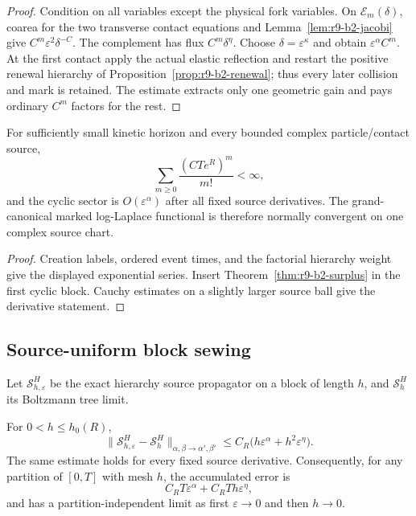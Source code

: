 \begin{proof}
Condition on all variables except the physical fork variables.  On
$\mathcal E_m(\delta)$, coarea for the two transverse contact equations and
Lemma~\ref{lem:r9-b2-jacobi} give
$C^m\varepsilon^2\delta^{-C}$.  The complement has flux
$C^m\delta^\eta$.  Choose $\delta=\varepsilon^\kappa$ and obtain
$\varepsilon^\alpha C^m$.  At the first contact apply the actual elastic
reflection and restart the positive renewal hierarchy of
Proposition~\ref{prop:r9-b2-renewal}; thus every later collision and mark is
retained.  The estimate extracts only one geometric gain and pays ordinary
$C^m$ factors for the rest.
\end{proof}

\begin{corollary}
\label{cor:r9-b2-cluster}
For sufficiently small kinetic horizon and every bounded complex
particle/contact source,
\[
 \sum_{m\ge0}\frac{(CTe^R)^m}{m!}<\infty,
\]
and the cyclic sector is $O(\varepsilon^\alpha)$ after all fixed source
derivatives.  The grand-canonical marked log-Laplace functional is therefore
normally convergent on one complex source chart.
\end{corollary}

\begin{proof}
Creation labels, ordered event times, and the factorial hierarchy weight give
the displayed exponential series.  Insert
Theorem~\ref{thm:r9-b2-surplus} in the first cyclic block.  Cauchy estimates on
a slightly larger source ball give the derivative statement.
\end{proof}

\subsection{Source-uniform block sewing}

Let $\mathcal S_{h,\varepsilon}^H$ be the exact hierarchy source propagator on
a block of length $h$, and $\mathcal S_h^H$ its Boltzmann tree limit.

\begin{theorem}
\label{thm:r9-b2-block}
For $0<h\le h_0(R)$,
\[
 \|\mathcal S_{h,\varepsilon}^H-\mathcal S_h^H\|_{
 \alpha,\beta\to\alpha',\beta'}
 \le C_R\bigl(h\varepsilon^\alpha+h^2\varepsilon^\eta\bigr).
\]
The same estimate holds for every fixed source derivative.  Consequently, for
any partition of $[0,T]$ with mesh $h$, the accumulated error is
\[
 C_R T\varepsilon^\alpha+C_RT h\varepsilon^\eta,
\]
and has a partition-independent limit as first $\varepsilon\to0$ and then
$h\to0$.
\end{theorem}

